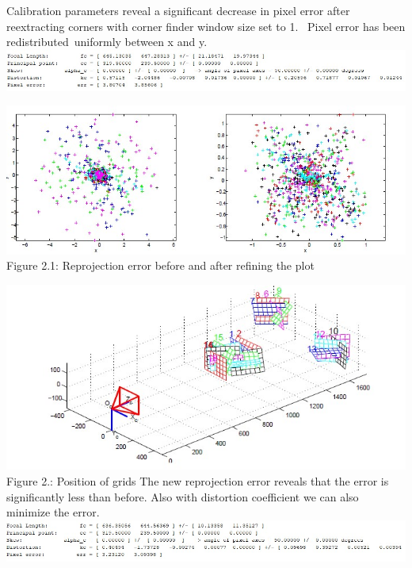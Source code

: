 \documentclass[a4paper, 12pt]{report}
\begin{document}
Calibration parameters reveal a significant decrease in pixel error after reextracting corners with corner finder window size set to 1.\newline 
 Pixel error has been redistributed uniformly between x and y. \newline 
\includegraphics[width=1.2\textwidth]{resources/image/im8_f1.jpg} \newline

\includegraphics[width=1.0\textwidth]{resources/image/24.jpg} \newline
Figure 2.1: Reprojection error before and after refining the plot  \newline

\includegraphics[width=1.1\textwidth]{resources/image/26.jpg} \newline
Figure 2.: Position of grids \newline \newline 
The new reprojection error reveals that the error is significantly less than before. \newline \newline 
Also with distortion coefficient we can also minimize the error.
 \newline 
\includegraphics[width=1.2\textwidth]{resources/image/im6n.jpg}
\newline
\end{document}
